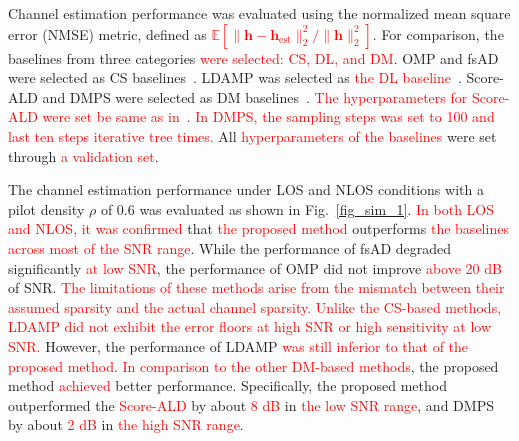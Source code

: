 \documentclass[lettersize,journal]{IEEEtran}
\newcommand{\tred}{\textcolor{red}}
\begin{document}
Channel estimation performance was evaluated using the normalized mean square error (NMSE) metric, defined as \tred{$\mathbb{E}[\|\mathbf{h}-\mathbf{h}_{\text{est}}\|_{2}^{2} / \|\mathbf{h}\|_{2}^{2}]$}. For comparison, the baselines from three categories \tred{were selected: CS, DL, and DM}. OMP and fsAD were selected as CS baselines~\cite{mendez-rialHybridMIMOArchitectures2016,zhangAtomicNormDenoisingBased2018}. LDAMP was selected as \tred{the DL baseline}~\cite{heDeepLearningBasedChannel2018}. Score-ALD and DMPS were selected as DM baselines~\cite{arvinteMIMOChannelEstimation2023,zhouGenerativeDiffusionModels2025}. \tred{The hyperparameters for Score-ALD were set be same as in~\cite{arvinteMIMOChannelEstimation2023}. In DMPS, the sampling steps was set to 100 and last ten steps iterative tree times.} All \tred{hyperparameters of the baselines} were set through \tred{a validation set}.

The channel estimation performance under LOS and NLOS conditions with a pilot density $\rho$ of 0.6 was evaluated as shown in Fig.~\ref{fig_sim_1}. \tred{In both LOS and NLOS, it was confirmed} that \tred{the proposed method} outperforms \tred{the baselines across most of the SNR range}. While the performance of fsAD degraded significantly \tred{at low SNR}, the performance of OMP did not improve \tred{above 20 dB} of SNR. \tred{The limitations of these methods arise from the mismatch between their assumed sparsity and the actual channel sparsity.} \tred{Unlike the CS-based methods, LDAMP did not exhibit the error floors at high SNR or high sensitivity at low SNR.} However, the performance of LDAMP \tred{was still inferior to that of the proposed method}. \tred{In comparison to the other DM-based methods}, the proposed method \tred{achieved} better performance. Specifically, the proposed method outperformed the \tred{Score-ALD} by about \tred{8 dB} in \tred{the low SNR range}, and DMPS by about \tred{2 dB} in \tred{the high SNR range}.
\end{document}
